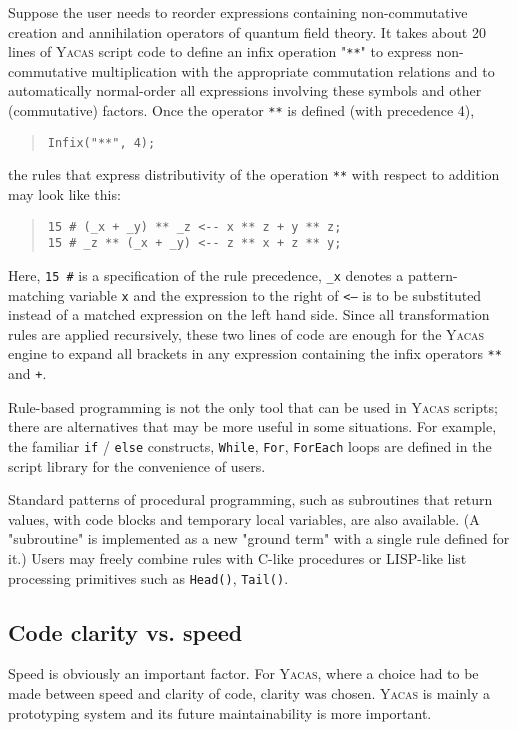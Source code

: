 \documentclass{llncs}
\begin{document}
Suppose the user needs to reorder expressions containing non-commutative creation and
annihilation operators of quantum field theory. It takes about 20 lines of
\textsc{Yacas} script code to define an infix operation "\texttt{**}" to express non-commutative
multiplication with the appropriate commutation relations and to automatically
normal-order all expressions involving these symbols and other (commutative)
factors. Once the operator \texttt{**} is defined (with precedence 4),
\begin{quote}\small\begin{verbatim}
Infix("**", 4);
\end{verbatim}\end{quote}
the rules that express distributivity of the operation \texttt{**} with
respect to addition may look like this:
\begin{quote}\small\begin{verbatim}
15 # (_x + _y) ** _z <-- x ** z + y ** z;
15 # _z ** (_x + _y) <-- z ** x + z ** y;
\end{verbatim}\end{quote}
Here, \verb|15 #| is a specification of the rule precedence, \verb|_x| denotes a
pattern-matching variable \texttt{x} and the expression to the right of \texttt{<--} is to be
substituted instead of a matched expression on the left hand side. Since all
transformation rules are applied recursively, these two lines of code are enough for the \textsc{Yacas}
engine to expand all brackets in any expression containing the infix operators
\texttt{**} and \texttt{+}.


Rule-based programming is not the only tool that can be used in \textsc{Yacas} scripts;
there are alternatives that may be more useful in some situations. For example,
the familiar \texttt{if} / \texttt{else} constructs, \texttt{While}, \texttt{For}, \texttt{ForEach} loops are
defined in the script library for the convenience of users.


Standard patterns of procedural programming, such as subroutines that
return values, with code blocks and temporary local variables, are also
available. (A "subroutine" is implemented as a new "ground term" with a single
rule defined for it.) Users may freely combine rules with C-like
procedures or LISP-like list processing primitives such as \texttt{Head()},
\texttt{Tail()}.


\subsection*{Code clarity vs. speed}
Speed is obviously an important factor. For \textsc{Yacas}, where a choice had to be
made between speed and clarity of code, clarity was chosen. \textsc{Yacas} is mainly a
prototyping system and its future maintainability is more important.
\end{document}
